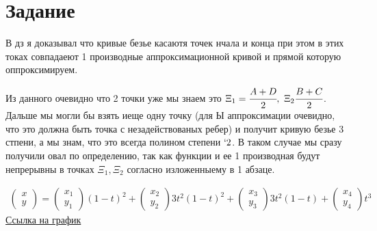 \section{Задание} 
В дз я доказывал что кривые безье касаютя точек нчала и конца 
при этом в этих токах совпадаеют 1 производные аппроксимационной кривой 
и прямой которую оппроксимируем.

Из данного очевидно что 2 точки уже мы знаем это 
$\Xi_1=\cfrac{A+D}{2}, \ \Xi_2\cfrac{B+C}{2}$. Дальше мы могли 
бы взять иеще одну точку (для Ы аппроксимации очевидно, что 
это должна быть точка с незадействованых ребер) и получит 
кривую безье 3 стпени, а 
мы знам, что это всегда полином степени $\lq 2$. 
В таком случае мы сразу получили овал по определению, так как функции
и ее 1 производная будут непрерывны в точках $\Xi_1, \Xi_2$ 
согласно изложенныему в 1 абзаце.

\begin{gather}
    \begin{pmatrix}
        x \\ y
    \end{pmatrix}
    = 
    \begin{pmatrix}
        x_1 \\ y_1
    \end{pmatrix}
    (1-t)^2
    +
    \begin{pmatrix}
        x_2 \\ y_2
    \end{pmatrix}
    3t^2(1-t)^2
    +
    \begin{pmatrix}
        x_3 \\ y_3
    \end{pmatrix}
    3t^2(1-t)
    +
    \begin{pmatrix}
        x_4 \\ y_4
    \end{pmatrix}
    t^3
\end{gather}
\href{https://www.desmos.com/calculator/g6zkwzxneq}{Ссылка на график}





